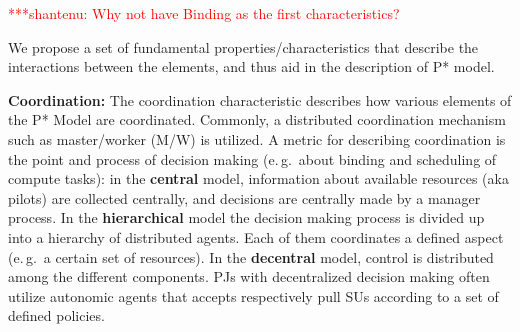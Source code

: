 \documentclass[conference,final]{IEEEtran}
\newcommand{\jhanote}[1]{ {\textcolor{red} { ***shantenu: #1 }}}
\newcommand{\alnote}[1]{ {\textcolor{blue} { ***andre: #1 }}}
\newcommand{\alnote}[1]{}
\newcommand{\jhanote}[1]{}
\begin{document}
\jhanote{Why not have Binding as the first characteristics?}

We propose a set of fundamental properties/characteristics that
describe the interactions between the elements, and thus aid in the
description of P* model.



\textbf{Coordination:} The coordination characteristic describes how
various elements of the P* Model are coordinated.
Commonly, a distributed coordination mechanism such as master/worker
(M/W) is utilized. A metric for describing coordination is the point and
process of decision making (e.\,g.\ about binding and
scheduling of compute tasks): in the \textbf{central} model,
information about available resources (aka pilots) are collected
centrally, and decisions are centrally made by a manager
process. %
In the \textbf{hierarchical} model the decision making process is
divided up into a hierarchy of distributed agents. Each of them
coordinates a defined aspect (e.\,g.\ a certain set of resources). In
the \textbf{decentral} model, control is distributed among the
different components.  PJs with decentralized decision making often
utilize autonomic agents that accepts respectively pull SUs according
to a set of defined policies.



% 
\end{document}
